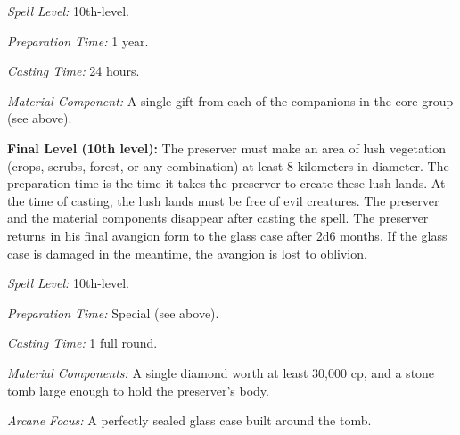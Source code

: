 {\textit{Spell Level:} 10th-level.

\textit{Preparation Time:} 1 year.

\textit{Casting Time:} 24 hours.

\textit{Material Component:} A single gift from each of the companions in the core group (see above).

\textbf{Final Level (10th level):} The preserver must make an area of lush vegetation (crops, scrubs, forest, or any combination) at least 8 kilometers in diameter. The preparation time is the time it takes the preserver to create these lush lands. At the time of casting, the lush lands must be free of evil creatures. The preserver and the material components disappear after casting the spell. The preserver returns in his final avangion form to the glass case after 2d6 months. If the glass case is damaged in the meantime, the avangion is lost to oblivion.

\textit{Spell Level:} 10th-level.

\textit{Preparation Time:} Special (see above).

\textit{Casting Time:} 1 full round.

\textit{Material Components:} A single diamond worth at least 30,000 cp, and a stone tomb large enough to hold the preserver's body.

\textit{Arcane Focus:} A perfectly sealed glass case built around the tomb.
}
